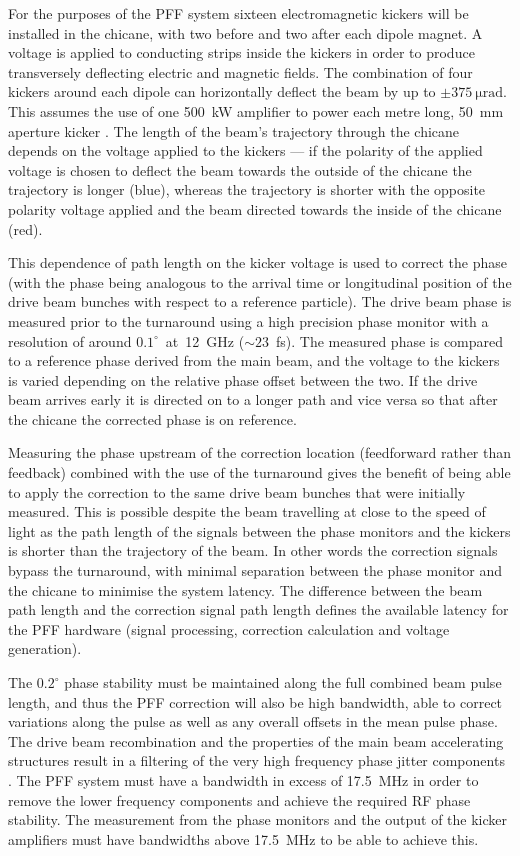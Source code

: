 For the purposes of the PFF system sixteen electromagnetic kickers will be installed in the chicane, with two before and two after each dipole magnet. A voltage is applied to conducting strips inside the kickers in order to produce transversely deflecting electric and magnetic fields. The combination of four kickers around each dipole can horizontally deflect the beam by up to \(\pm375~\mathrm{\mu rad}\). This assumes the use of one 500~kW amplifier to power each metre long, 50~mm aperture kicker \cite{clicCDR}. The length of the beam's trajectory through the chicane depends on the voltage applied to the kickers --- if the polarity of the applied voltage is chosen to deflect the beam towards the outside of the chicane the trajectory is longer (blue), whereas the trajectory is shorter with the opposite polarity voltage applied and the beam directed towards the inside of the chicane (red).

This dependence of path length on the kicker voltage is used to correct the phase (with the phase being analogous to the arrival time or longitudinal position of the drive beam bunches with respect to a reference particle). The drive beam phase is measured prior to the turnaround using a high precision phase monitor with a resolution of around \(0.1^\circ\)~at~12~GHz (\(\sim23\)~fs). The measured phase is compared to a reference phase derived from the main beam, and the voltage to the kickers is varied depending on the relative phase offset between the two. If the drive beam arrives early it is directed on to a longer path and vice versa so that after the chicane the corrected phase is on reference.

Measuring the phase upstream of the correction location (feedforward rather than feedback) combined with the use of the turnaround gives the benefit of being able to apply the correction to the same drive beam bunches that were initially measured. This is possible  despite the beam travelling at close to the speed of light as the path length of the signals between the phase monitors and the kickers is shorter than the trajectory of the beam. In other words the correction signals bypass the turnaround, with minimal separation between the phase monitor and the chicane to minimise the system latency. The difference between the beam path length and the correction signal path length defines the available latency for the PFF hardware (signal processing, correction calculation and voltage generation).

The \(0.2^\circ\) phase stability must be maintained along the full combined beam pulse length, and thus the PFF correction will also be high bandwidth, able to correct variations along the pulse as well as any overall offsets in the mean pulse phase. The drive beam recombination and the properties of the main beam accelerating structures result in a filtering of the very high frequency phase jitter components \cite{alexThesis}. The PFF system must have a bandwidth in excess of 17.5~MHz in order to remove the lower frequency components and achieve the required RF phase stability. The measurement from the phase monitors and the output of the kicker amplifiers must have bandwidths above 17.5~MHz to be able to achieve this.

